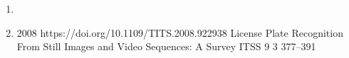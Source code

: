 \begin{enumerate}
\item{}
\item{}
  {
  }
  {2008}
  {https://doi.org/10.1109/TITS.2008.922938}
  {License Plate Recognition From Still Images and Video Sequences: A Survey}
  {ITSS}
  {9}
  {3}
  {377--391}
  {}
\end{enumerate}





